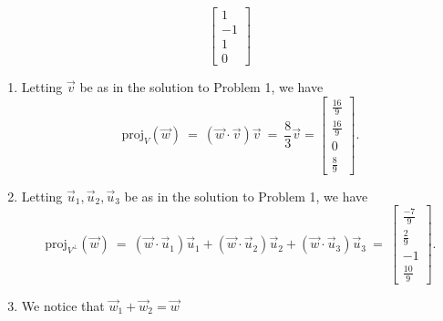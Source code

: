 \begin{SaveQuestion}
\begin{enumerate}
\begin{enumerate}
$$\begin{bmatrix}
            1 \\ -1 \\ 1 \\ 0
        \end{bmatrix}$$
        \end{enumerate}
        \begin{enumerate}
			\item 	Letting $\vec{v}$ be as in the solution to Problem 1, we have
			\[
			\text{proj}_{V}(\vec{w}) \ = \ \left(\vec{w}\cdot\vec{v}\right)\vec{v} \ = \ \frac{8}{3} \vec v = \begin{bmatrix}
			    \frac{16}{9} \\ \frac{16}{9} \\ 0 \\ \frac{8}{9}
			\end{bmatrix}.
			\]
            \item Letting $\vec u_1, \vec u_2, \vec u_3$ be as in the solution to Problem 1, we have
            $$
            \text{proj}_{V^{\perp}}(\vec{w}) \ = \ \left(\vec{w}\cdot\vec{u}_1\right)\vec{u}_1 + \left(\vec{w}\cdot\vec{u}_2\right)\vec{u}_2 + \left(\vec{w}\cdot\vec{u}_3\right)\vec{u}_3 \ = \ \begin{bmatrix}
			    \frac{-7}{9} \\ \frac{2}{9} \\ -1 \\ \frac{10}{9}
			\end{bmatrix}.
            $$
            \item We notice that $\vec w_1 + \vec w_2 = \vec w$
        \end{enumerate}
		\end{enumerate}
\end{SaveQuestion}



